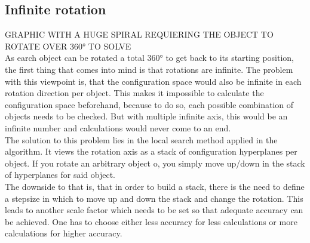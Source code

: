 \subsection{Infinite rotation}
GRAPHIC WITH A HUGE SPIRAL REQUIERING THE OBJECT TO ROTATE OVER 360° TO SOLVE\\
As earch object can be rotated a total 360° to get back to its starting position, the first thing that comes into mind is that rotations are infinite. The problem with this viewpoint is, that the configuration space would also be infinite in each rotation direction per object. This makes it impossible to calculate the configuration space beforehand, because to do so, each possible combination of objects needs to be checked. But with multiple infinite axis, this would be an infinite number and calculations would never come to an end. \\
The solution to this problem lies in the local search method applied in the algorithm. It views the rotation axis as a stack of configuration hyperplanes per object. If you rotate an arbitrary object o, you simply move up/down in the stack of hyperplanes for said object. \\
The downside to that is, that in order to build a stack, there is the need to define a stepsize in which to move up and down the stack and change the rotation. This leads to another scale factor which needs to be set so that adequate accuracy can be achieved. One has to choose either less accuracy for less calculations or more calculations for higher accuracy.